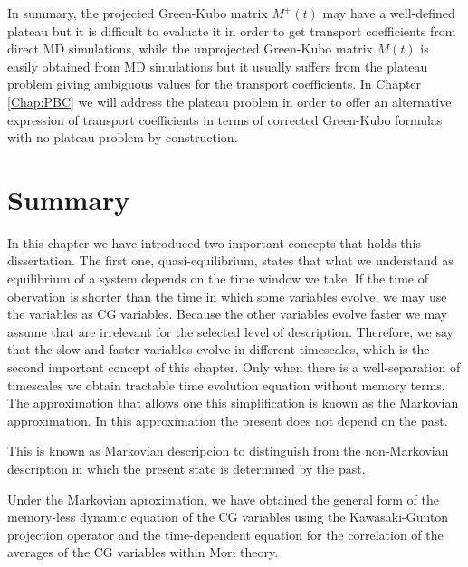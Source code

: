 \documentclass[b5paper,openright,10pt]{book}
\newcommand{\Note}[1]{{\bf \color{red}#1}}    %
\begin{document}
In  summary,  the projected  Green-Kubo  matrix  $M^+(t)$ may  have  a
well-defined plateau  but it is difficult  to evaluate it in  order to
get  transport  coefficients from  direct  MD  simulations, while  the
unprojected  Green-Kubo  matrix  $M(t)$  is easily  obtained  from  MD
simulations but  it usually  suffers from  the plateau  problem giving
ambiguous values for the transport coefficients.  In Chapter \ref{Chap:PBC} we will address the plateau problem in order to offer an alternative expression of transport coefficients in terms of corrected Green-Kubo formulas with no plateau problem by construction.

\section{Summary}
In this chapter we have introduced two important concepts that holds this dissertation. The first one, quasi-equilibrium, states that what we understand as equilibrium of a system depends on the time window we take. If the time of obervation is shorter than the time in which some variables evolve, we may use the variables as CG variables. 
Because the other variables evolve faster we may assume that are irrelevant for the selected level of description. 
Therefore, we say that the slow and faster variables evolve in different timescales, which is the second important concept of this chapter. 
Only when there is a well-separation of timescales we obtain tractable time evolution equation without memory terms. 
The approximation that allows one this simplification is known as the Markovian approximation. In this approximation the present does not depend on the past. 

This is known as Markovian descripcion to distinguish from the non-Markovian description in which the present state is determined by the past. 

Under the Markovian aproximation, we have obtained the general form of the memory-less dynamic equation of the CG variables using the Kawasaki-Gunton projection operator and the time-dependent equation for the correlation of the averages of the CG variables within Mori theory. 

\end{document}
